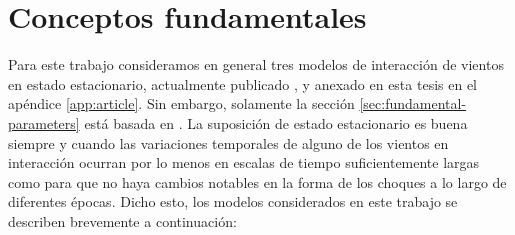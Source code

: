 \chapter{Conceptos fundamentales}
\label{chap:Modelo-generico}
\thispagestyle{empty}
 Para este trabajo consideramos en general tres modelos de interacción de vientos en estado estacionario, actualmente publicado \citep{Tarango-Yong:2018a}, y anexado en esta tesis en el apéndice \ref{app:article}. Sin embargo, solamente la sección \ref{sec:fundamental-parameters} está basada en \citet{Canto:1996}. La suposición de estado estacionario es buena siempre y cuando las variaciones temporales de alguno de los vientos en interacción ocurran por lo menos en escalas de tiempo suficientemente largas como para que no haya cambios notables en la forma de los choques a lo largo de diferentes épocas. Dicho esto, los modelos considerados en este trabajo se describen brevemente a continuación:

